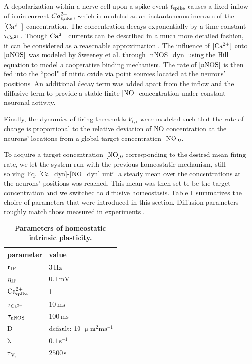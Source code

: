 \documentclass[10pt,letterpaper]{article}
\begin{document}
A depolarization within a nerve cell upon a spike-event $t_{\rm spike}$ causes a fixed inflow of ionic current $Ca^{2+}_{\rm spike}$, which is modeled as an instantaneous increase of the $\rm [Ca^{2+}]$ concentration. The concentration decays exponentially by a time constant $\tau_{\rm Ca^{2+}}$. Though $\rm Ca^{2+}$ currents can be described in a much more detailed fashion, it can be considered as a reasonable approximation \cite[p.~198-203]{Theor_Neur_Dayan}. The influence of $\rm [Ca^{2+}]$ onto $\rm [nNOS]$ was modeled by Sweeney et al. through \eqref{nNOS_dyn} using the Hill equation \cite{Hill_Equ} to model a cooperative binding mechanism. The rate of $\rm [nNOS]$ is then fed into the ``pool" of nitric oxide via point sources located at the neurons' positions. An additional decay term was added apart from the inflow and the diffusive term to provide a stable finite $\rm [NO]$ concentration under constant neuronal activity.

Finally, the dynamics of firing thresholds $V_{t,i}$ were modeled such that the rate of change is proportional to the relative deviation of NO concentration at the neurons' locations from a global target concentration $\rm [NO]_0$. 

To acquire a target concentration $\rm [NO]_0$ corresponding to the desired mean firing rate, we let the system run with the previous homeostatic mechanism, still solving Eq. \eqref{Ca_dyn}-\eqref{NO_dyn} until a steady mean over the concentrations at the neurons' positions was reached. This mean was then set to be the target concentration and we switched to diffusive homeostasis. Table \ref{Params_IP} summarizes the choice of parameters that were introduced in this section. Diffusion parameters roughly match those measured in experiments \cite{Philippides_2000}.
\begin{table}
\caption{\bf Parameters of homeostatic intrinsic plasticity.}
\begin{tabular}{|l|l|}
\hline
\textbf{parameter} & \textbf{value} \\
\hline
$\mathrm{r_{\rm IP}}$ & $\mathrm{3\,Hz}$ \\
\hline
$\mathrm{\eta_{\rm IP}}$ & $\mathrm{0.1\,mV}$ \\
\hline
$\mathrm{Ca^{2+}_{\rm spike}}$ & 1 \\ \hline
$\mathrm{\tau_{\rm Ca^{2+}}}$ &  $\mathrm{10\,ms}$ \\
\hline
$\mathrm{\tau_{\rm nNOS}}$ & $\mathrm{100\,ms}$ \\
\hline
$\mathrm{D}$ & default: 10 $\mathrm{\upmu m^2 ms^{-1}}$ \\
\hline 
$\mathrm{\lambda}$ & $\mathrm{0.1\,s^{-1}}$ \\
\hline
$\mathrm{\tau_{V_t}}$ & $\mathrm{2500\,s}$ \\
\hline
\end{tabular}
\label{Params_IP}
\end{table}
\end{document}
